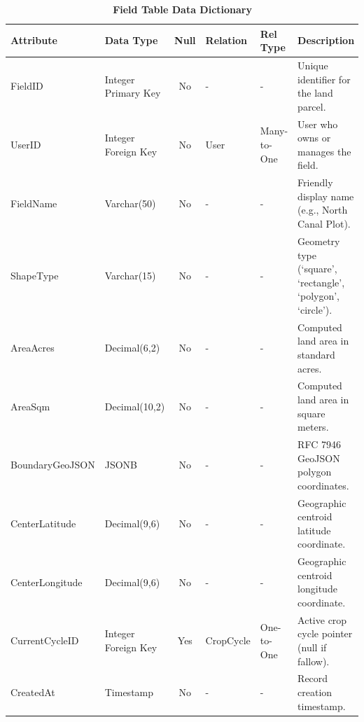 \documentclass{FastFyp}
\begin{document}
\begin{table}[!htbp]
\footnotesize
\centering
\caption{\label{tab:field_table} \textbf{Field Table Data Dictionary}}
\begin{tabular}{|l|l|c|l|l|p{4.5cm}|}
\hline
\textbf{Attribute} & \textbf{Data Type} & \textbf{Null} & \textbf{Relation} & \textbf{Rel Type} & \textbf{Description} \\ \hline
FieldID & Integer Primary Key & No & - & - & Unique identifier for the land parcel. \\ \hline
UserID & Integer Foreign Key & No & User & Many-to-One & User who owns or manages the field. \\ \hline
FieldName & Varchar(50) & No & - & - & Friendly display name (e.g., North Canal Plot). \\ \hline
ShapeType & Varchar(15) & No & - & - & Geometry type (`square', `rectangle', `polygon', `circle'). \\ \hline
AreaAcres & Decimal(6,2) & No & - & - & Computed land area in standard acres. \\ \hline
AreaSqm & Decimal(10,2) & No & - & - & Computed land area in square meters. \\ \hline
BoundaryGeoJSON & JSONB & No & - & - & RFC 7946 GeoJSON polygon coordinates. \\ \hline
CenterLatitude & Decimal(9,6) & No & - & - & Geographic centroid latitude coordinate. \\ \hline
CenterLongitude & Decimal(9,6) & No & - & - & Geographic centroid longitude coordinate. \\ \hline
CurrentCycleID & Integer Foreign Key & Yes & CropCycle & One-to-One & Active crop cycle pointer (null if fallow). \\ \hline
CreatedAt & Timestamp & No & - & - & Record creation timestamp. \\ \hline
\end{tabular}
\end{table}
\end{document}
